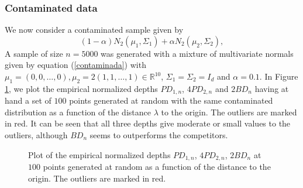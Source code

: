 \documentclass[a4paper]{article}
\numberwithin{equation}{section}
\begin{document}
\subsubsection{Contaminated data}
We now consider a contaminated sample given by 
\begin{equation}
 (1-\alpha) N_2\left(\mu_1, \Sigma_1 \right) +  \alpha N_2\left(\mu_2, \Sigma_2\right),
\label{contaminada}
\end{equation} 
A sample of size $n=5000$ was generated with a mixture of multivariate normals given by equation (\ref{contaminada}) with
 $\mu_1=(0,0, \ldots,0), \mu_2= 2 (1,1, \ldots,1)  \in \mathbb{R}^{10}$,  $\Sigma_1= \Sigma_2= I_d$ and $\alpha=0.1$. In Figure  \ref{prof_alta_out}, we plot the empirical normalized depths  $PD_{1,n}$, $4PD_{2,n}$ and $2BD_n$ having at hand a set of $100$ points generated at random with the same contaminated  distribution %
as a function of the distance $\lambda$ to the origin.   The outliers are marked in red. It can be seen that all three depths give moderate or small values to the outliers, although  $BD_n$ seems to outperforms the competitors.
\begin{figure}[!ht]
\centering
{}
\caption{ Plot of the empirical normalized depths $PD_{1,n}$, $4PD_{2,n}$, $2BD_n$  at $100$ points generated at random as a function of the distance to the origin. The outliers are marked in red.} \label{prof_alta_out}  
\end{figure}
\end{document}
